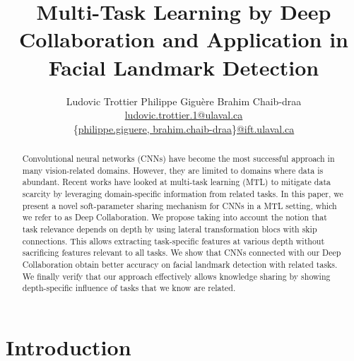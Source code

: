 \documentclass[runningheads]{llncs}
\begin{document}
\pagestyle{headings}
\mainmatter
\def\ECCV18SubNumber{1653}  %

\title{Multi-Task Learning by Deep Collaboration and Application in Facial Landmark Detection}


\author{
    Ludovic Trottier \qquad Philippe Gigu\`ere \qquad Brahim Chaib-draa \\
    {\footnotesize \url{ludovic.trottier.1@ulaval.ca}} \\
    {\footnotesize \{\url{philippe.giguere, brahim.chaib-draa}\}\url{@ift.ulaval.ca}}
}


\maketitle

\begin{abstract}
    Convolutional neural networks (CNNs) have become the most successful approach in many vision-related domains. However, they are limited to domains where data is abundant. 
    Recent works have looked at multi-task learning (MTL) to mitigate data scarcity by leveraging domain-specific information from related tasks.
    In this paper, we present a novel soft-parameter sharing mechanism for CNNs in a MTL setting, which we refer to as Deep Collaboration. We propose taking into account the notion that task relevance depends on depth by using lateral transformation blocs with skip connections. This allows extracting task-specific features at various depth without sacrificing features relevant to all tasks.
    We show that CNNs connected with our Deep Collaboration obtain better accuracy on facial landmark detection with related tasks. We finally verify that our approach effectively allows knowledge sharing by showing depth-specific influence of tasks that we know are related.
\end{abstract}

\section{Introduction}
\label{sec:intro}
\end{document}
